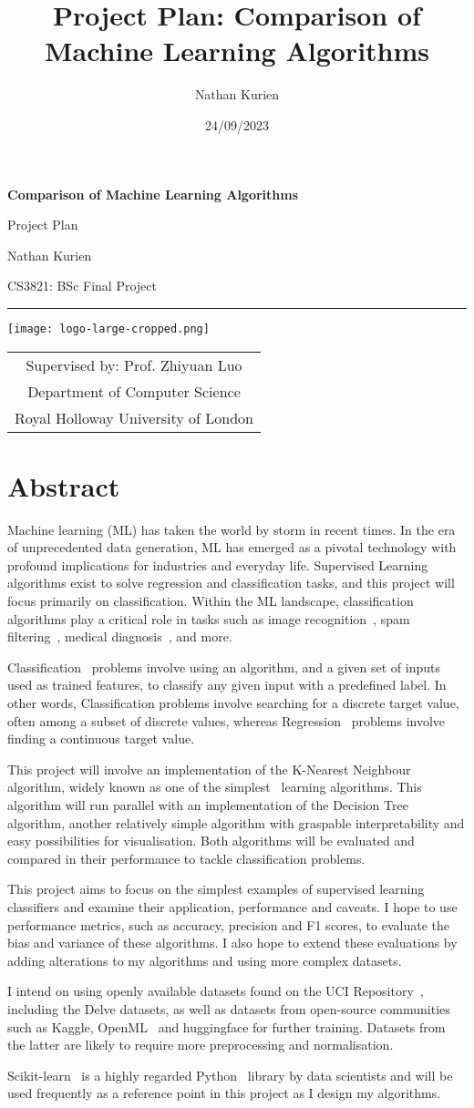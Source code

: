 \documentclass[letterpaper,11pt]{article}
\title{Project Plan: Comparison of Machine Learning Algorithms}
\author{Nathan Kurien}
\date{24/09/2023} %
\renewcommand{\maketitle}{
  \begin{center}
    {\LARGE\textbf{Comparison of Machine Learning Algorithms}}\par
    {\Large Project Plan}\par
    \vspace{10pt}
    Nathan Kurien\par
    CS3821: BSc Final Project \par
    \hrule %
    \vspace{20pt}
    \texttt{[image: logo-large-cropped.png]}
    \vspace{30pt}
    \begin{tabular}{c}
      Supervised by: Prof. Zhiyuan Luo \\
      Department of Computer Science \\
      Royal Holloway University of London
    \end{tabular}
  \end{center}
  \newpage
}
\begin{document}
\maketitle

\section{Abstract}

Machine learning (ML) has taken the world by storm in recent times. In the era of unprecedented data generation, ML has emerged as a pivotal technology with profound implications for industries and everyday life. Supervised Learning algorithms exist to solve regression and classification tasks, and this project will focus primarily on classification. Within the ML landscape, classification algorithms play a critical role in tasks such as image recognition~\cite{imgdetectiondeepl}, spam filtering~\cite{spamfiltering}, medical diagnosis~\cite{diabetesclassification}, and more.\par
Classification~\cite{classificationreviewkotsiantis,mlreviewduttonconroy} problems involve using an algorithm, and a given set of inputs used as trained features, to classify any given input with a predefined label. In other words, Classification problems involve searching for a discrete target value, often among a subset of discrete values, whereas Regression~\cite{mlreviewduttonconroy} problems involve finding a continuous target value. \par
This project will involve an implementation of the K-Nearest Neighbour~\cite{NNCoverHart} algorithm, widely known as one of the simplest~\cite{simpleNN} learning algorithms. This algorithm will run parallel with an implementation of the Decision Tree~\cite{autodectreesmurthy, dectreeCharbuty} algorithm, another relatively simple algorithm with graspable interpretability and easy possibilities for visualisation. Both algorithms will be evaluated and compared in their performance to tackle classification problems. \par
This project aims to focus on the simplest examples of supervised learning classifiers and examine their application, performance and caveats. I hope to use performance metrics, such as accuracy, precision and F1 scores, to evaluate the bias and variance of these algorithms. I also hope to extend these evaluations by adding alterations to my algorithms and using more complex datasets. \par
I intend on using openly available datasets found on the UCI Repository~\cite{uci}, including the Delve datasets, as well as datasets from open-source communities such as Kaggle, OpenML~\cite{OpenML2013} and huggingface for further training. Datasets from the latter are likely to require more preprocessing and normalisation. \par
Scikit-learn~\cite{scikit-learn} is a highly regarded Python~\cite{python3} library by data scientists and will be used frequently as a reference point in this project as I design my algorithms.
\end{document}
